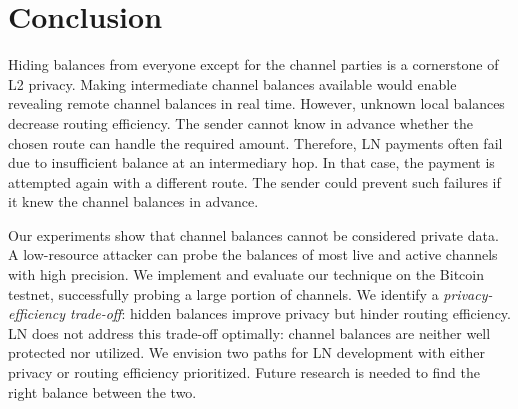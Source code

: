 \section{Conclusion} \label{sec:conclusion}

Hiding balances from everyone except for the channel parties is a cornerstone of L2 privacy.
Making intermediate channel balances available would enable revealing remote channel balances in real time.
However, unknown local balances decrease routing efficiency.
The sender cannot know in advance whether the chosen route can handle the required amount.
Therefore, LN payments often fail due to insufficient balance at an intermediary hop.
In that case, the payment is attempted again with a different route.
The sender could prevent such failures if it knew the channel balances in advance.

Our experiments show that channel balances cannot be considered private data.
A low-resource attacker can probe the balances of most live and active channels with high precision.
We implement and evaluate our technique on the Bitcoin testnet, successfully probing a large portion of channels.
We identify a \textit{privacy-efficiency trade-off}: hidden balances improve privacy but hinder routing efficiency.
LN does not address this trade-off optimally: channel balances are neither well protected nor utilized.
We envision two paths for LN development with either privacy or routing efficiency prioritized.
Future research is needed to find the right balance between the two.
